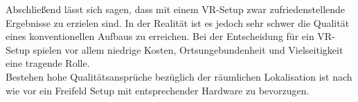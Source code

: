 

%
Abschließend lässt sich sagen, dass mit einem VR-Setup zwar zufriedenstellende Ergebnisse zu erzielen sind. In der Realität ist es jedoch sehr schwer die Qualität eines konventionellen Aufbaus zu erreichen. Bei der Entscheidung für ein VR-Setup spielen vor allem niedrige Kosten, Ortsungebundenheit und Vielseitigkeit eine tragende Rolle.\\
Bestehen hohe Qualitätsansprüche bezüglich der räumlichen Lokalisation ist nach wie vor ein Freifeld Setup mit entsprechender Hardware zu bevorzugen.